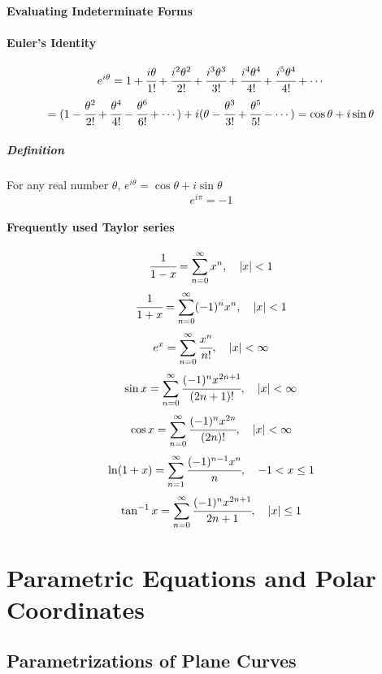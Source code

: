 \documentclass{article}
\begin{document}
            \paragraph{Evaluating Indeterminate Forms}
            \paragraph{Euler's Identity}
                \[e^{i\theta}=1+\cfrac{i\theta}{1!}+\cfrac{i^2\theta^2}{2!}+\cfrac{i^3\theta^3}{3!}+\cfrac{i^4\theta^4}{4!}+\cfrac{i^5\theta^4}{4!}+\cdots\]
                \[=(1-\cfrac{\theta^2}{2!}+\cfrac{\theta^4}{4!}-\cfrac{\theta^6}{6!}+\cdots)+i(\theta-\cfrac{\theta^3}{3!}+\cfrac{\theta^5}{5!}-\cdots)=\cos \theta +i\sin \theta\]
                \subparagraph{Definition} For any real number $\theta$, $e^{i\theta}=\cos \theta+i\sin\theta$
                \[e^{i\pi}=-1\]
            \paragraph{Frequently used Taylor series}
            \[\cfrac{1}{1-x}=\sum_{n=0}^\infty x^n,\quad |x|<1\]
            \[\cfrac{1}{1+x}=\sum_{n=0}^\infty (-1)^nx^n,\quad |x|<1\]
            \[e^x=\sum_{n=0}^\infty \cfrac{x^n}{n!},\quad|x|<\infty\]
            \[\sin x=\sum_{n=0}^\infty\cfrac{(-1)^n x^{2n+1}}{(2n+1)!},\quad |x|<\infty\]
            \[\cos x=\sum_{n=0}^\infty\cfrac{(-1)^nx^{2n}}{(2n)!},\quad |x|<\infty\]
            \[\ln(1+x)=\sum_{n=1}^\infty\cfrac{(-1)^{n-1}x^n}{n},\quad -1<x\le 1\]
            \[\tan ^{-1}x=\sum_{n=0}^\infty\cfrac{(-1)^n x^{2n+1}}{2n+1},\quad |x|\le 1\]
    
    \newpage
    \section{Parametric Equations and Polar Coordinates}
        \subsection{Parametrizations of Plane Curves}
\end{document}
